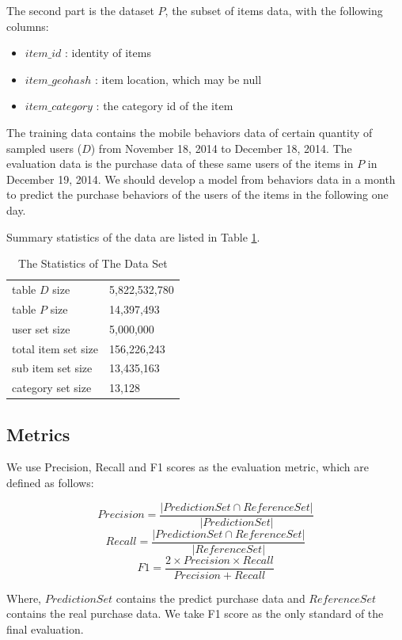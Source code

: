 \documentclass{llncs}
\begin{document}
The second part is the dataset $P$, the subset of items data,
with the following columns:
\begin{itemize}
	\item $item\_id$ : identity of items
	\item $item\_geohash$ : item location, which may be null
	\item $item\_category$ : the category id of the item
\end{itemize}

The training data contains the mobile behaviors data of
certain quantity of sampled users ($D$) from November 18, 2014
to December 18, 2014.
The evaluation data is the purchase data of these same users of
the items in $P$ in December 19, 2014.
We should develop a model from behaviors data in a month
to predict the purchase behaviors of the users of the items
in the following one day.

Summary statistics of the data are listed in Table \ref{tab:sta}.
\begin{table}[htbp]
	\normalsize
	\centering
	\caption{The Statistics of The Data Set}
	\begin{tabular}{|l|l|}
		\hline
		table $D$ size & 5,822,532,780 \\
		table $P$ size & 14,397,493 \\
		\hline
		user set size & 5,000,000 \\
		total item set size & 156,226,243 \\
		sub item set size & 13,435,163 \\
		category set size & 13,128 \\
		\hline
	\end{tabular}
	\label{tab:sta}
\end{table}

\subsection{Metrics}
We use Precision, Recall and F1 scores as the evaluation metric, which are defined as follows:

$$ Precision = \frac{ \left| PredictionSet \cap ReferenceSet \right| }{ \left| PredictionSet \right| } $$
$$ Recall = \frac{ \left| PredictionSet \cap ReferenceSet \right| }{ \left| ReferenceSet \right| } $$
$$ F1 = \frac{ 2 \times Precision \times Recall }{ Precision + Recall } $$

Where, $PredictionSet$ contains the predict purchase data and $ReferenceSet$ contains the real purchase data.
We take F1 score as the only standard of the final evaluation.
\end{document}
